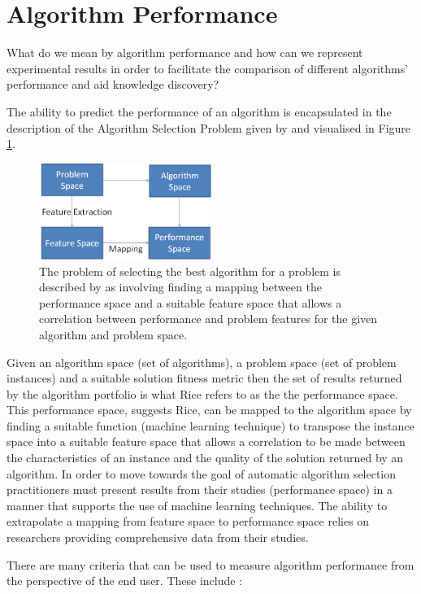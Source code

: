 \documentclass[a4paper]{article}
\begin{document}
\section{Algorithm Performance}
What do we mean by algorithm performance and how can we represent experimental results in order to facilitate the comparison of different algorithms' performance and aid knowledge discovery?

The ability to predict the performance of an algorithm is encapsulated in the description of the Algorithm Selection Problem given by \cite{Rice1976} and visualised in Figure \ref{rice}.

\begin{figure}[h!]
\centering
\includegraphics[width=0.5\textwidth]{img/rice}
\caption{\label{rice} The problem of selecting the best algorithm for a problem is described by \cite{Rice1976} as involving finding a mapping between the performance space and a suitable feature space that allows a correlation between performance and problem features for the given algorithm and problem space. 
}
\end{figure} 

Given an algorithm space (set of algorithms), a problem space (set of problem instances) and a suitable solution fitness metric then the set of results returned by the algorithm portfolio is what Rice refers to as the the performance space. This performance space, suggests Rice, can be mapped to the algorithm space by finding a suitable function (machine learning technique) to transpose the instance space into a suitable feature space that allows a correlation to be made between the characteristics of an instance and the quality of the solution returned by an algorithm.
In order to move towards the goal of automatic algorithm selection practitioners must present results from their studies (performance space) in a manner that supports the use of machine learning techniques. The ability to extrapolate a mapping from feature space to performance space relies on researchers providing comprehensive data from their studies.

There are many criteria that can be used to measure algorithm performance from the perspective of the end user. These include : 
\end{document}
